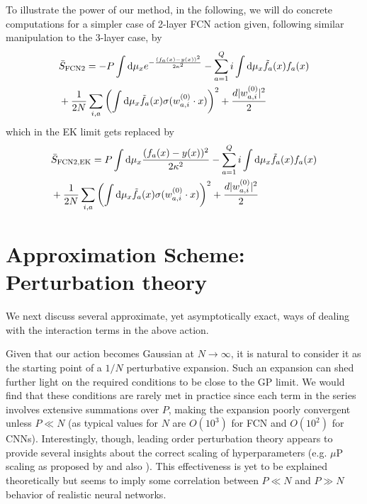 To illustrate the power of our method, in the following, we will do concrete computations for a simpler case of 2-layer FCN action given, following similar manipulation to the 3-layer case, by 
\begin{align}
\label{Eq:S_FCN2_nonEK}
&\bar{S}_{\text{FCN2}}= -P\int \text{d}\mu_x e^{-\frac{(f_a(x)-y(x))^2}{2\kappa^2}} - \sum_{a=1}^Q i\int \text{d} \mu_x \tilde{f}_a(x) f_a(x) \\ \nonumber 
&+\frac{1}{2N} \sum_{i,a} \left(\int \text{d}\mu_x \tilde{f}_a(x) \sigma({w}^{(0)}_{a,i} \cdot {x})\right)^2 + \frac{d |{ w_{a,i}^{(0)}}|^2}{2}
\end{align}
which in the EK limit gets replaced by  
\begin{align}
\label{Eq:S_FCN2}
&\bar{S}_{\text{FCN2,EK}}= P\int \text{d}\mu_x \frac{(f_a(x)-y(x))^2}{2\kappa^2} - \sum_{a=1}^Q i\int \text{d} \mu_x \tilde{f}_a(x) f_a(x) \\ \nonumber 
&+\frac{1}{2N} \sum_{i,a} \left(\int \text{d}\mu_x \tilde{f}_a(x) \sigma({w}^{(0)}_{a,i} \cdot {x})\right)^2 + \frac{d |{ w_{a,i}^{(0)}}|^2}{2}
\end{align}

\section{Approximation Scheme: Perturbation theory}
We next discuss several approximate, yet asymptotically exact, ways of dealing with the interaction terms in the above action.  

Given that our action becomes Gaussian at $N\rightarrow \infty$, it is natural to consider it as the starting point of a $1/N$ perturbative expansion. Such an expansion can shed further light on the required conditions to be close to the GP limit. We would find that these conditions are rarely met in practice since each term in the series involves extensive summations over $P$, making the expansion poorly convergent unless $P \ll  N$ (as typical values for $N$ are $O(10^3)$ for FCN and $O(10^2)$ for CNNs). Interestingly, though, leading order perturbation theory appears to provide several insights about the correct scaling of hyperparameters (e.g. $\mu$P scaling as proposed by \cite{yang2022tensorprogramsvtuning} and also \cite{dinan2023effectivetheorytransformersinitialization}). This effectiveness is yet to be explained theoretically but seems to imply some correlation between $P \ll N$ and $P \gg N$ behavior of realistic neural networks.  

